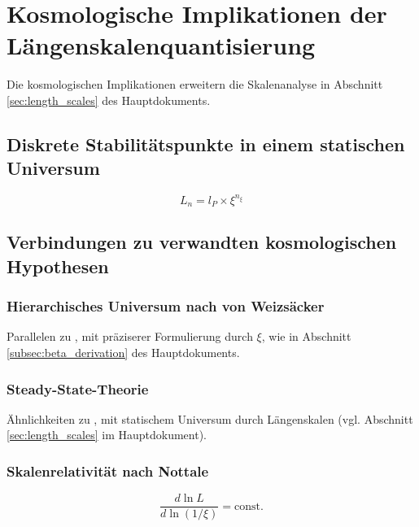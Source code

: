 \documentclass[12pt,a4paper]{article}
\begin{document}
	\section{Kosmologische Implikationen der Längenskalenquantisierung}
	\label{sec:kosmologische_implikationen}
	
	Die kosmologischen Implikationen erweitern die Skalenanalyse in Abschnitt \ref{sec:length_scales} des Hauptdokuments.
	
	\subsection{Diskrete Stabilitätspunkte in einem statischen Universum}
	\label{subsec:stabilitaetspunkte}
	
	\begin{equation}
		\label{eq:laengenquantisierung}
		L_n = l_P \times \xi^{n_\xi}
	\end{equation}
	
	\subsection{Verbindungen zu verwandten kosmologischen Hypothesen}
	\label{subsec:verwandte_hypothesen}
	
	\subsubsection{Hierarchisches Universum nach von Weizsäcker}
	\label{subsubsec:weizsaecker}
	
	Parallelen zu \cite{weizsacker1951}, mit präziserer Formulierung durch \(\xi\), wie in Abschnitt \ref{subsec:beta_derivation} des Hauptdokuments.
	
	\subsubsection{Steady-State-Theorie}
	\label{subsubsec:steady_state}
	
	Ähnlichkeiten zu \cite{hoyle1948}, mit statischem Universum durch Längenskalen (vgl. Abschnitt \ref{sec:length_scales} im Hauptdokument).
	
	\subsubsection{Skalenrelativität nach Nottale}
	\label{subsubsec:nottale}
	
	\begin{equation}
		\label{eq:skaleninvarianz}
		\frac{d\ln L}{d\ln(1/\xi)} = \text{const.}
	\end{equation}
	
\end{document}
